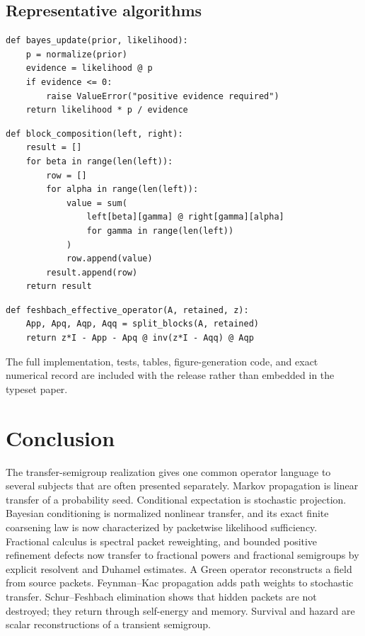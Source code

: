 \documentclass[11pt,a4paper]{article}
\theoremstyle{definition}
\theoremstyle{remark}
\begin{document}
\subsection{Representative algorithms}

\begin{lstlisting}[caption={Normalized finite Bayesian update.}]
def bayes_update(prior, likelihood):
    p = normalize(prior)
    evidence = likelihood @ p
    if evidence <= 0:
        raise ValueError("positive evidence required")
    return likelihood * p / evidence
\end{lstlisting}

\begin{lstlisting}[caption={Packet block composition.}]
def block_composition(left, right):
    result = []
    for beta in range(len(left)):
        row = []
        for alpha in range(len(left)):
            value = sum(
                left[beta][gamma] @ right[gamma][alpha]
                for gamma in range(len(left))
            )
            row.append(value)
        result.append(row)
    return result
\end{lstlisting}

\begin{lstlisting}[caption={Finite Schur-Feshbach effective operator.}]
def feshbach_effective_operator(A, retained, z):
    App, Apq, Aqp, Aqq = split_blocks(A, retained)
    return z*I - App - Apq @ inv(z*I - Aqq) @ Aqp
\end{lstlisting}

The full implementation, tests, tables, figure-generation code, and exact numerical record are included with the release rather than embedded in the typeset paper.

\section{Conclusion}\label{core:section:19}

The transfer-semigroup realization gives one common operator language to several subjects that are often presented separately. Markov propagation is linear transfer of a probability seed. Conditional expectation is stochastic projection. Bayesian conditioning is normalized nonlinear transfer, and its exact finite coarsening law is now characterized by packetwise likelihood sufficiency. Fractional calculus is spectral packet reweighting, and bounded positive refinement defects now transfer to fractional powers and fractional semigroups by explicit resolvent and Duhamel estimates. A Green operator reconstructs a field from source packets. Feynman--Kac propagation adds path weights to stochastic transfer. Schur--Feshbach elimination shows that hidden packets are not destroyed; they return through self-energy and memory. Survival and hazard are scalar reconstructions of a transient semigroup.
\end{document}
